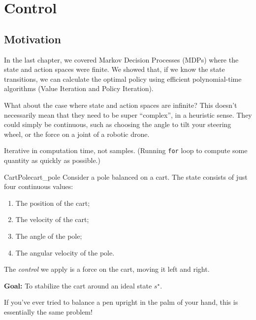 \documentclass[../main/main]{subfiles}
\begin{document}
    
\chapter{Control}

\section{Motivation}

In the last chapter, we covered Markov Decision Processes (MDPs) where the state
and action spaces were finite.
We showed that, if we know the state transitions,
we can calculate the optimal policy using efficient polynomial-time algorithms
(Value Iteration and Policy Iteration).


What about the case where state and action spaces are infinite?
This doesn't necessarily mean that they need to be super ``complex'', in a heuristic sense.
They could simply be continuous, such as choosing the angle to tilt your
steering wheel, or the force on a joint of a robotic drone.



Iterative in computation time, not samples.
(Running \texttt{for} loop to compute some quantity as quickly as possible.)


\begin{example}{CartPole}{cart_pole}
    Consider a pole balanced on a cart.
    The state consists of just four continuous values:
    \begin{enumerate}
        \item The position of the cart;
        \item The velocity of the cart;
        \item The angle of the pole;
        \item The angular velocity of the pole.
    \end{enumerate}
    The \emph{control} we apply is a force on the cart, moving it left and right.

    \textbf{Goal:} To stabilize the cart around an ideal state $s^\star$.

    If you've ever tried to balance a pen upright in the palm of your hand, this is essentially the same problem!
\end{example}
\end{document}
